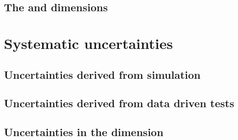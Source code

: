 \subsection{The \MHT and \nb dimensions}


\section{Systematic uncertainties}

\subsection{Uncertainties derived from simulation}

\subsection{Uncertainties derived from data driven tests}

\subsection{Uncertainties in the \MHT dimension}

